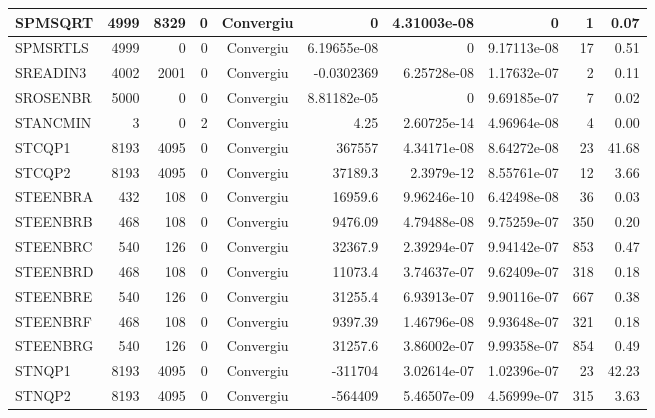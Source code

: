 \begin{center}
\begin{longtable}{|l|r|r|r|c|r|r|r|r|r|}
 SPMSQRT &   4999 &   8329 &      0 & Convergiu  &           0 &    4.31003e-08 &           0 &      1 &    0.07 \\ \hline
SPMSRTLS &   4999 &      0 &      0 & Convergiu  & 6.19655e-08 &              0 & 9.17113e-08 &     17 &    0.51 \\ \hline
SREADIN3 &   4002 &   2001 &      0 & Convergiu  &  -0.0302369 &    6.25728e-08 & 1.17632e-07 &      2 &    0.11 \\ \hline
SROSENBR &   5000 &      0 &      0 & Convergiu  & 8.81182e-05 &              0 & 9.69185e-07 &      7 &    0.02 \\ \hline
STANCMIN &      3 &      0 &      2 & Convergiu  &        4.25 &    2.60725e-14 & 4.96964e-08 &      4 &    0.00 \\ \hline
  STCQP1 &   8193 &   4095 &      0 & Convergiu  &      367557 &    4.34171e-08 & 8.64272e-08 &     23 &   41.68 \\ \hline
  STCQP2 &   8193 &   4095 &      0 & Convergiu  &     37189.3 &     2.3979e-12 & 8.55761e-07 &     12 &    3.66 \\ \hline
STEENBRA &    432 &    108 &      0 & Convergiu  &     16959.6 &    9.96246e-10 & 6.42498e-08 &     36 &    0.03 \\ \hline
STEENBRB &    468 &    108 &      0 & Convergiu  &     9476.09 &    4.79488e-08 & 9.75259e-07 &    350 &    0.20 \\ \hline
STEENBRC &    540 &    126 &      0 & Convergiu  &     32367.9 &    2.39294e-07 & 9.94142e-07 &    853 &    0.47 \\ \hline
STEENBRD &    468 &    108 &      0 & Convergiu  &     11073.4 &    3.74637e-07 & 9.62409e-07 &    318 &    0.18 \\ \hline
STEENBRE &    540 &    126 &      0 & Convergiu  &     31255.4 &    6.93913e-07 & 9.90116e-07 &    667 &    0.38 \\ \hline
STEENBRF &    468 &    108 &      0 & Convergiu  &     9397.39 &    1.46796e-08 & 9.93648e-07 &    321 &    0.18 \\ \hline
STEENBRG &    540 &    126 &      0 & Convergiu  &     31257.6 &    3.86002e-07 & 9.99358e-07 &    854 &    0.49 \\ \hline
  STNQP1 &   8193 &   4095 &      0 & Convergiu  &     -311704 &    3.02614e-07 & 1.02396e-07 &     23 &   42.23 \\ \hline
  STNQP2 &   8193 &   4095 &      0 & Convergiu  &     -564409 &    5.46507e-09 & 4.56999e-07 &    315 &    3.63 \\ \hline

\end{longtable}
\end{center}
